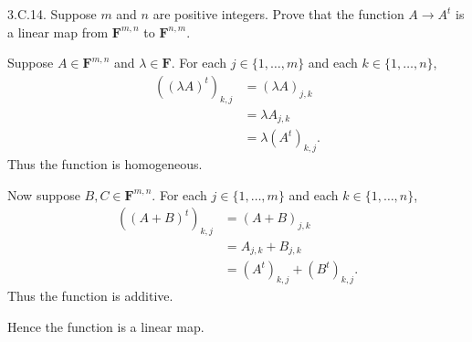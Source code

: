 \documentclass[a5paper]{article}
\begin{document}
\newcommand   \C           {\mathbf{C}}
\newcommand   \R           {\mathbf{R}}
\renewcommand \L           {\mathcal{L}}
\newcommand   \F           {\mathbf{F}}
\renewcommand \P           {\mathcal{P}}
\newcommand   \M           {\mathcal{M}}
\newcommand   \op          {\operatorname}


    3.C.14.
    Suppose $m$ and $n$ are positive integers.
    Prove that the function $A \rightarrow A^t$ is a linear map from $\F^{m,n}$ to $\F^{n,m}$.


    Suppose $A \in \F^{m,n}$ and $\lambda \in \F$.
    For each $j \in \{1,\dots,m\}$ and each $k \in \{1,\dots,n\}$,
\begin{align*}
        ((\lambda A)^t)_{k,j} &= (\lambda A)_{j,k} \\
                              &= \lambda A_{j,k} \\
                              &= \lambda (A^t)_{k,j} .
\end{align*}
    Thus the function is homogeneous.

    Now suppose $B, C \in \F^{m,n}$.
    For each $j \in \{1,\dots,m\}$ and each $k \in \{1,\dots,n\}$,
\begin{align*}
        ((A+B)^t)_{k,j} &= (A+B)_{j,k} \\
                        &= A_{j,k} + B_{j,k} \\
                        &= (A^t)_{k,j} + (B^t)_{k,j} .
\end{align*}
    Thus the function is additive.

    Hence the function is a linear map.
\end{document}
